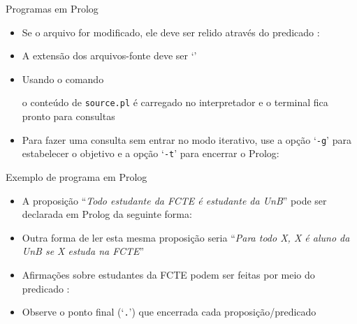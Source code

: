 \begin{frame}[fragile]{Programas em Prolog}

    \begin{itemize}
        \item Se o arquivo for modificado, ele deve ser relido através do predicado 
            :


        \item A extensão dos arquivos-fonte deve ser `'

        \item Usando o comando


        o conteúdo de \texttt{source.pl} é carregado no interpretador e o terminal fica 
        pronto para consultas

        \item Para fazer uma consulta sem entrar no modo iterativo, use a opção `\texttt{-g}'
            para estabelecer o objetivo e a opção `\texttt{-t}' para encerrar o Prolog:


    \end{itemize}

\end{frame}

\begin{frame}[fragile]{Exemplo de programa em Prolog}

    \begin{itemize}
        \item A proposição ``\textit{Todo estudante da FCTE é estudante da UnB}'' pode
            ser declarada em Prolog da seguinte forma:


        \item Outra forma de ler esta mesma proposição seria ``\textit{Para todo X, X é aluno 
            da UnB se X estuda na FCTE}''

        \item Afirmações sobre estudantes da FCTE podem ser feitas por meio do predicado
            :

    
        \item Observe o ponto final (`\texttt{.}') que encerrada cada proposição/predicado

    \end{itemize}

\end{frame}


